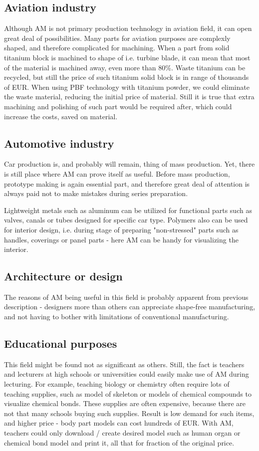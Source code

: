 \documentclass[a4paper, 11pt, reqno]{report}
\begin{document}
\subsection{Aviation industry}
Although AM is not primary production technology in aviation field, it can open great deal of possibilities. Many parts for aviation purposes are complexly shaped, and therefore complicated for machining. When a part from solid titanium block is machined to shape of i.e. turbine blade, it can mean that most of the material is machined away, even more than 80\%. Waste titanium can be recycled, but still the price of such titanium solid block is in range of thousands of EUR. When using PBF technology with titanium powder, we could eliminate the waste material, reducing the initial price of material. Still it is true that extra machining and polishing of such part would be required after, which could increase the costs, saved on material.
\subsection{Automotive industry}
Car production is, and probably will remain, thing of mass production. Yet, there is still place where AM can prove itself as useful. Before mass production, prototype making is again essential part, and therefore great deal of attention is always paid not to make mistakes during series preparation.

	Lightweight metals such as aluminum can be utilized for functional parts such as valves, canals or tubes designed for specific car type. Polymers also can be used for interior design, i.e. during stage of preparing "non-stressed" parts such as handles, coverings or panel parts - here AM can be handy for visualizing the interior.
	\clearpage
\subsection{Architecture or design}
The reasons of AM being useful in this field is probably apparent from previous description - designers more than others can appreciate shape-free manufacturing, and not having to bother with limitations of conventional manufacturing. 
\subsection{Educational purposes}
This field might be found not as significant as others. Still, the fact is teachers and lecturers at high schools or universities could easily make use of AM during lecturing. For example, teaching biology or chemistry often require lots of teaching supplies, such as model of skeleton or models of chemical compounds to visualize chemical bonds. These supplies are often expensive, because there are not that many schools buying such supplies. Result is low demand for such items, and higher price - body part models can cost hundreds of EUR. With AM, teachers could only download / create desired model such as human organ or chemical bond model and print it, all that for fraction of the original price.
%
%
%
\end{document}
